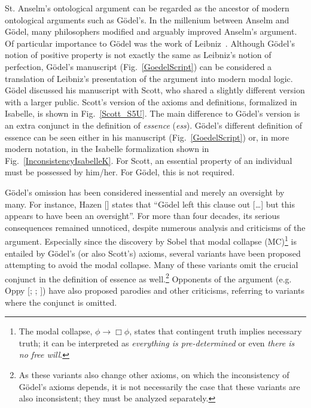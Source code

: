 \documentclass{article}
\begin{document}
St. Anselm's ontological argument \cite{Proslogion} can be regarded as
the ancestor of modern ontological arguments such as G\"odel's. In the
millenium between Anselm and G\"odel, many philosophers modified and
arguably improved Anselm's argument. Of particular importance to
G\"odel was the work of Leibniz~\cite{Adams}.  
Although G\"odel's notion of positive property is not exactly the same as Leibniz's notion of perfection, G\"odel's manuscript
(Fig.~\ref{GoedelScript}) can be considered a translation of Leibniz's
presentation of the argument into modern modal logic. G\"odel
discussed his manuscript with Scott, who shared a slightly different
version with a larger public. Scott's version of the axioms and
definitions, formalized in Isabelle, is shown in
Fig.~\ref{Scott_S5U}. The main difference to G\"odel's version is an
extra conjunct in the definition of \emph{essence} (\emph{ess}). G\"odel's
different definition of essence can be seen either in his manuscript
(Fig.~\ref{GoedelScript}) or, in more modern notation, in the Isabelle
formalization shown in Fig.~\ref{InconsistencyIsabelleK}. For Scott,
an essential property of an individual must be possessed by
him/her. For G\"odel, this is not required. 

G\"odel's omission has been
considered inessential and merely an oversight by many. For instance,
Hazen [\citeyear[p.365]{Hazen}] states that ``G\"odel left this
clause out [\ldots] but this appears to have been an oversight''.
For more than four decades, its serious consequences remained unnoticed, 
despite numerous analysis and criticisms of the
argument. Especially since the discovery by Sobel
 that modal collapse (MC)\footnote{The modal collapse,
  $\phi\rightarrow \Box \phi$, states that contingent truth implies
  necessary truth; it can be interpreted as \textit{everything is
    pre-determined} or even \textit{there is no free will}. } is
entailed by G\"odel's (or also Scott's) axioms, several variants have
been proposed
\cite{Anderson,AndersonGettings,Hajek1,Hajek2,Hajek3,Bjordal}
attempting to avoid the modal collapse. Many of these variants omit
the crucial conjunct in the definition of essence as well.\footnote{As
  these variants also change other axioms, on which the inconsistency
  of G\"odel's axioms depends, it is not necessarily the case that
  these variants are also inconsistent; they must be analyzed
  separately.} Opponents of the argument
(e.g. Oppy [\citeyear[p.226--227]{oppy96:_goedel_ontol_argum};
\citeyear[p.364]{oppy00:_respon_gettin};
\citeyear[p.1068]{oppy08:_higher_order_ontol_argum}]) have also proposed
parodies and other criticisms, referring to variants where the
conjunct is omitted.
\end{document}
